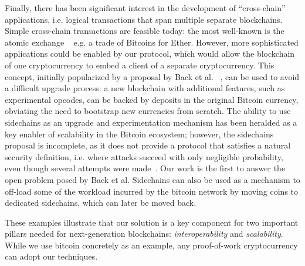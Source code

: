 Finally, there has been significant interest in the development of
``cross-chain'' applications, i.e. logical transactions that span multiple
separate blockchains. Simple cross-chain transactions are feasible today: the
most well-known is the atomic exchange ~\cite{tiernolan} e.g. a trade of
Bitcoins for Ether. However, more sophisticated applications could be enabled by
our protocol, which would allow the blockchain of one cryptocurrency to embed a
client of a separate cryptocurrency. This concept, initially popularized by a
proposal by Back et al. ~\cite{sidechains}, can be used to avoid a difficult
upgrade process: a new blockchain with additional features, such as experimental
opcodes, can be backed by deposits in the original Bitcoin currency, obviating
the need to bootstrap new currencies from scratch. The ability to use sidechains
as an upgrade and experimentation mechanism has been heralded as a key enabler
of scalability in the Bitcoin ecosystem; however, the sidechains proposal is
incomplete, as it does not provide a protocol that satisfies a natural security
definition, i.e. where attacks succeed with only negligible probability, even
though several attempts were made~\cite{pos,compactspv}. Our work is the
first to answer the open problem posed by Back et al. Sidechains can also be
used as a mechanism to off-load some of the workload incurred by the bitcoin
network by moving coins to dedicated sidechains, which can later be moved back.

These examples illustrate that our solution is a key component for two important
pillars needed for next-generation blockchains: \textit{interoperability} and
\textit{scalability}. While we use bitcoin concretely as an example, any
proof-of-work cryptocurrency can adopt our techniques.

